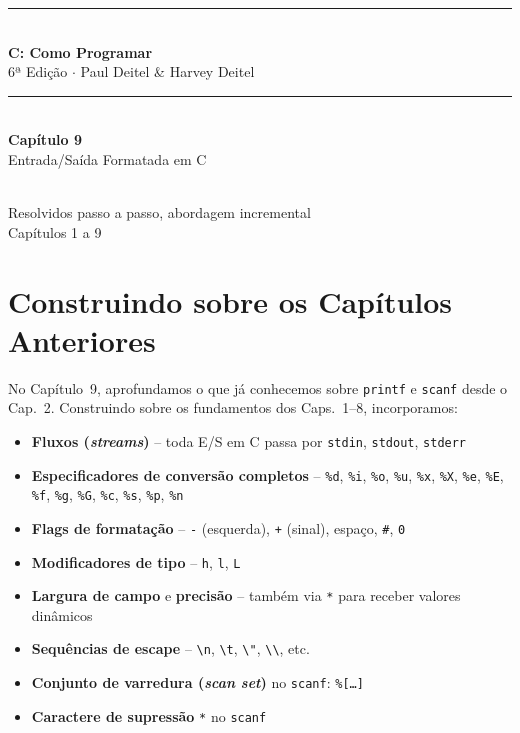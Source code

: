 \documentclass[12pt,a4paper]{article}
\begin{document}
\begin{titlepage}
  \centering\vspace*{2cm}
  {\color{deitelblue}\rule{\linewidth}{2pt}}\\[0.4cm]
  {\huge\bfseries\color{deitelblue}C: Como Programar}\\[0.2cm]
  {\large\color{deitelblue}6ª Edição $\cdot$ Paul Deitel \& Harvey Deitel}\\[0.2cm]
  {\color{deitelblue}\rule{\linewidth}{2pt}}\\[1cm]
  {\LARGE\bfseries Capítulo 9}\\[0.3cm]
  {\Large\color{deitelblue!80}Entrada/Saída Formatada em C}\\[0.8cm]
  \begin{tcolorbox}[colback=deitellightblue,colframe=deitelblue,width=0.85\linewidth]
    \\[0.2cm]
    {\normalsize Resolvidos passo a passo, abordagem incremental\\
    Capítulos 1 a 9}
  \end{tcolorbox}
\end{titlepage}

\section*{Construindo sobre os Capítulos Anteriores}

No Capítulo~9, aprofundamos o que já conhecemos sobre \texttt{printf} e
\texttt{scanf} desde o Cap.~2. Construindo sobre os fundamentos dos Caps.~1--8,
incorporamos:

\begin{itemize}[noitemsep]
  \item \textbf{Fluxos (\textit{streams})} -- toda E/S em C passa por \texttt{stdin},
  \texttt{stdout}, \texttt{stderr}
  \item \textbf{Especificadores de conversão completos} -- \texttt{\%d}, \texttt{\%i},
  \texttt{\%o}, \texttt{\%u}, \texttt{\%x}, \texttt{\%X}, \texttt{\%e}, \texttt{\%E},
  \texttt{\%f}, \texttt{\%g}, \texttt{\%G}, \texttt{\%c}, \texttt{\%s}, \texttt{\%p},
  \texttt{\%n}
  \item \textbf{Flags de formatação} -- \texttt{-} (esquerda), \texttt{+} (sinal),
  espaço, \texttt{\#}, \texttt{0}
  \item \textbf{Modificadores de tipo} -- \texttt{h}, \texttt{l}, \texttt{L}
  \item \textbf{Largura de campo} e \textbf{precisão} -- também via \texttt{*}
  para receber valores dinâmicos
  \item \textbf{Sequências de escape} -- \texttt{\textbackslash n}, \texttt{\textbackslash t},
  \texttt{\textbackslash "}, \texttt{\textbackslash \textbackslash}, etc.
  \item \textbf{Conjunto de varredura (\textit{scan set})} no \texttt{scanf}: \texttt{\%[\ldots]}
  \item \textbf{Caractere de supressão} \texttt{*} no \texttt{scanf}
\end{itemize}
\end{document}
